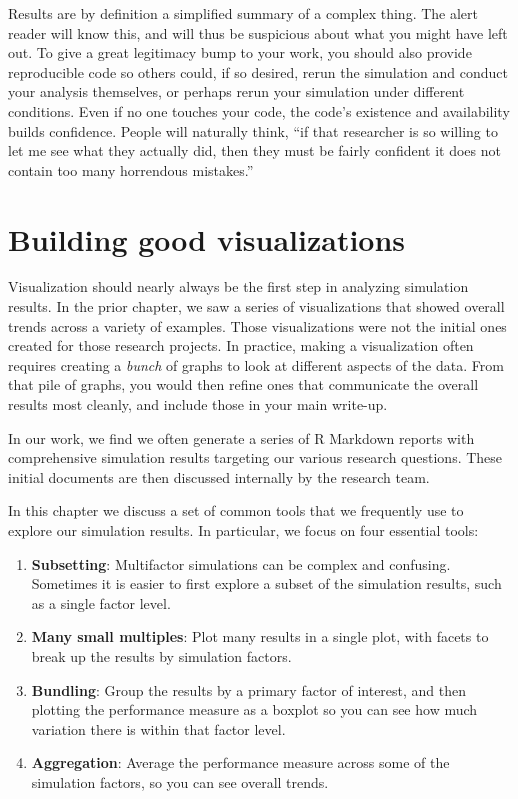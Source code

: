 \documentclass[
]{book}
\providecommand{\tightlist}{%
  \setlength{\itemsep}{0pt}\setlength{\parskip}{0pt}}
\begin{document}
Results are by definition a simplified summary of a complex thing.
The alert reader will know this, and will thus be suspicious about what you might have left out.
To give a great legitimacy bump to your work, you should also provide reproducible code so others could, if so desired, rerun the simulation and conduct your analysis themselves, or perhaps rerun your simulation under different conditions.
Even if no one touches your code, the code's existence and availability builds confidence.
People will naturally think, ``if that researcher is so willing to let me see what they actually did, then they must be fairly confident it does not contain too many horrendous mistakes.''

\chapter{Building good visualizations}\label{building-good-visualization}

Visualization should nearly always be the first step in analyzing simulation results.
In the prior chapter, we saw a series of visualizations that showed overall trends across a variety of examples.
Those visualizations were not the initial ones created for those research projects.
In practice, making a visualization often requires creating a \emph{bunch} of graphs to look at different aspects of the data.
From that pile of graphs, you would then refine ones that communicate the overall results most cleanly, and include those in your main write-up.

In our work, we find we often generate a series of R Markdown reports with comprehensive simulation results targeting our various research questions.
These initial documents are then discussed internally by the research team.

In this chapter we discuss a set of common tools that we frequently use to explore our simulation results.
In particular, we focus on four essential tools:

\begin{enumerate}
\def\labelenumi{\arabic{enumi}.}
\tightlist
\item
  \textbf{Subsetting}: Multifactor simulations can be complex and confusing. Sometimes it is easier to first explore a subset of the simulation results, such as a single factor level.
\item
  \textbf{Many small multiples}: Plot many results in a single plot, with facets to break up the results by simulation factors.
\item
  \textbf{Bundling}: Group the results by a primary factor of interest, and then plotting the performance measure as a boxplot so you can see how much variation there is within that factor level.
\item
  \textbf{Aggregation}: Average the performance measure across some of the simulation factors, so you can see overall trends.
\end{enumerate}
\end{document}
